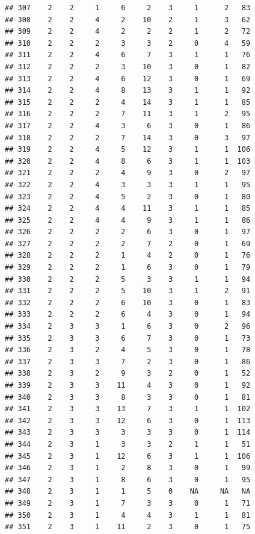 \documentclass[krantz2]{krantz}\usepackage{knitr}%
\begin{document}
\begin{knitrout}
\begin{kframe}
\begin{verbatim}
## 307    2    2     1     6     2    3     1      2   83
## 308    2    2     4     2    10    2     1      3   62
## 309    2    2     4     2     2    2     1      2   72
## 310    2    2     2     3     3    2     0      4   59
## 311    2    2     4     6     7    3     1      1   76
## 312    2    2     2     3    10    3     0      1   82
## 313    2    2     4     6    12    3     0      1   69
## 314    2    2     4     8    13    3     1      1   92
## 315    2    2     2     4    14    3     1      1   85
## 316    2    2     2     7    11    3     1      2   95
## 317    2    2     4     3     6    3     0      1   86
## 318    2    2     2     7    14    3     0      3   97
## 319    2    2     4     5    12    3     1      1  106
## 320    2    2     4     8     6    3     1      1  103
## 321    2    2     2     4     9    3     0      2   97
## 322    2    2     4     3     3    3     1      1   95
## 323    2    2     4     5     2    3     0      1   80
## 324    2    2     4     4    11    3     1      1   85
## 325    2    2     4     4     9    3     1      1   86
## 326    2    2     2     2     6    3     0      1   97
## 327    2    2     2     2     7    2     0      1   69
## 328    2    2     2     1     4    2     0      1   76
## 329    2    2     2     1     6    3     0      1   79
## 330    2    2     2     5     3    3     1      1   94
## 331    2    2     2     5    10    3     1      2   91
## 332    2    2     2     6    10    3     0      1   83
## 333    2    2     2     6     4    3     0      1   94
## 334    2    3     3     1     6    3     0      2   96
## 335    2    3     3     6     7    3     0      1   73
## 336    2    3     2     4     5    3     0      1   78
## 337    2    3     3     7     2    3     0      1   86
## 338    2    3     2     9     3    2     0      1   52
## 339    2    3     3    11     4    3     0      1   92
## 340    2    3     3     8     3    3     0      1   81
## 341    2    3     3    13     7    3     1      1  102
## 342    2    3     3    12     6    3     0      1  113
## 343    2    3     3     3     3    3     0      1  114
## 344    2    3     1     3     3    2     1      1   51
## 345    2    3     1    12     6    3     1      1  106
## 346    2    3     1     2     8    3     0      1   99
## 347    2    3     1     8     6    3     0      1   95
## 348    2    3     1     1     5    0    NA     NA   NA
## 349    2    3     1     7     3    3     0      1   71
## 350    2    3     1     4     4    3     1      1   81
## 351    2    3     1    11     2    3     0      1   75

\end{verbatim}
\end{kframe}
\end{knitrout}
\end{document}
